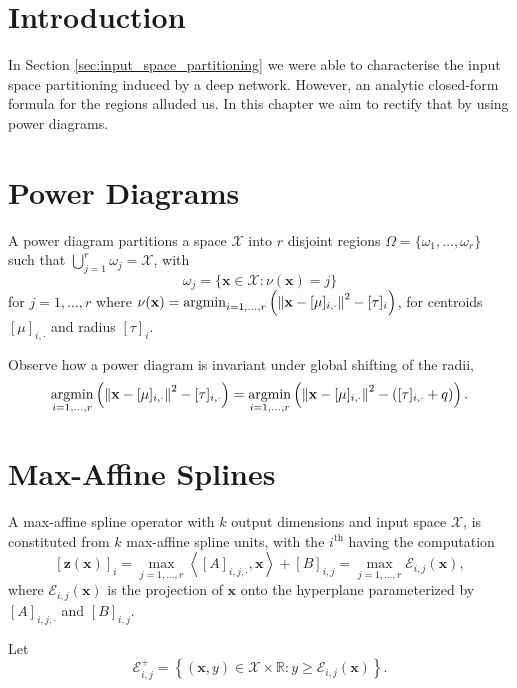 \section{Introduction}

In Section \ref{sec:input_space_partitioning} we were able to characterise the input space partitioning induced by a deep network. However, an analytic closed-form formula for the regions alluded us. In this chapter we aim to rectify that by using power diagrams. 

\section{Power Diagrams}

\begin{definition}
    A power diagram partitions a space $\mathcal{X}$ into $r$ disjoint regions $\Omega=\{\omega_1,\dots,\omega_r\}$ such that $\bigcup_{j=1}^r\omega_j=\mathcal{X}$, with $$\omega_j=\{\mathbf{x}\in\mathcal{X}:\nu(\mathbf{x})=j\}$$for $j=1,\dots,r$ where $\nu(\mathbf{x})=\operatorname*{\mathrm{argmin}}_{i=1,\dots,r}\left(\left\Vert\mathbf{x}-[\mu]_{i,\cdot}\right\Vert^2-[\tau]_i\right)$, for centroids $[\mu]_{i,\cdot}$ and radius $[\tau]_i$.
\end{definition}

Observe how a power diagram is invariant under global shifting of the radii, $$\operatorname*{\mathrm{argmin}}_{i=1,\dots,r}\left(\left\Vert\mathbf{x}-[\mu]_{i,\cdot}\right\Vert^2-[\tau]_{i,\cdot}\right)=\operatorname*{\mathrm{argmin}}_{i=1,\dots,r}\left(\left\Vert\mathbf{x}-[\mu]_{i,\cdot}\right\Vert^2-\left([\tau]_{i,\cdot}+q\right)\right).$$

\section{Max-Affine Splines}

A max-affine spline operator with $k$ output dimensions and input space $\mathcal{X}$, is constituted from $k$ max-affine spline units, with the $i^{\text{th}}$ having the computation 
\begin{equation}\label{eq:maso_unit_operation}
    [\mathbf{z}(\mathbf{x})]_i=\max_{j=1,\dots,r}\left\langle[A]_{i,j,\cdot},\mathbf{x}\right\rangle+[B]_{i,j}=\max_{j=1,\dots,r}\mathcal{E}_{i,j}(\mathbf{x}),
\end{equation}
where $\mathcal{E}_{i,j}(\mathbf{x})$ is the projection of $\mathbf{x}$ onto the hyperplane parameterized by $[A]_{i,j,\cdot}$ and $[B]_{i,j}$.

Let $$\mathcal{E}^+_{i,j}=\left\{(\mathbf{x},y)\in\mathcal{X}\times\mathbb{R}:y\geq\mathcal{E}_{i,j}(\mathbf{x})\right\}.$$

